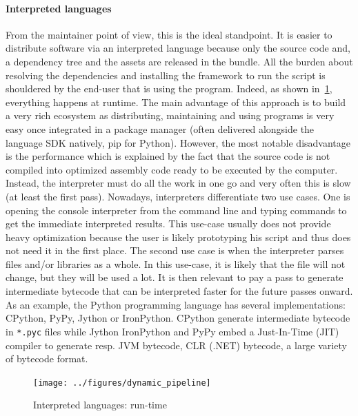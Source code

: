\paragraph{Interpreted languages} From the maintainer point of view, this is the ideal standpoint. It is easier to
distribute software via an interpreted language because only the source code and, a dependency tree and the assets are
released in the bundle. All the burden about resolving the dependencies and installing the framework to run the script
is shouldered by the end-user that is using the program. Indeed, as shown in~\cref{fig:static.dynamic.dynamic.pipeline},
everything happens at runtime. The main advantage of this approach is to build a very rich ecosystem as distributing,
maintaining and using programs is very easy once integrated in a package manager (often delivered alongside the language
SDK natively, \eg pip for Python). However, the most notable disadvantage is the performance which is explained by the
fact that the source code is not compiled into optimized assembly code ready to be executed by the computer. Instead,
the interpreter must do all the work in one go and very often this is slow (at least the first pass). Nowadays,
interpreters differentiate two use cases. One is opening the console interpreter from the command line and typing
commands to get the immediate interpreted results. This use-case usually does not provide heavy optimization because the
user is likely prototyping his script and thus does not need it in the first place. The second use case is when the
interpreter parses files and/or libraries as a whole. In this use-case, it is likely that the file will not change, but
they will be used a lot. It is then relevant to pay a pass to generate intermediate bytecode that can be interpreted
faster for the future passes onward. As an example, the Python programming language has several implementations:
CPython, PyPy, Jython or IronPython. CPython generate intermediate bytecode in \texttt{*.pyc} files while Jython
IronPython and PyPy embed a Just-In-Time (JIT) compiler to generate resp. JVM bytecode, CLR (.NET) bytecode, a large
variety of bytecode format.

\begin{figure}[htbp]
  \centering
  \texttt{[image: ../figures/dynamic\_pipeline]}
  \caption{Interpreted languages: run-time}
  \label{fig:static.dynamic.dynamic.pipeline}
\end{figure}

